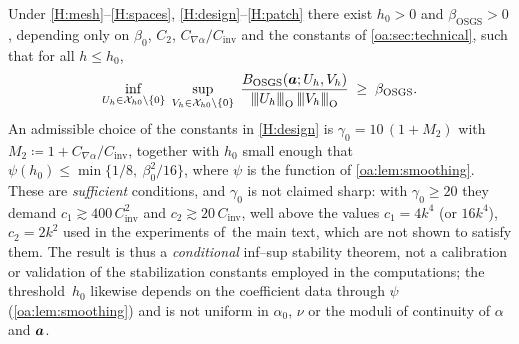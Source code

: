 \begin{theorem}
\label{oa:th:stability}
Under \cref{H:mesh}--\cref{H:spaces}, \cref{H:design}--\cref{H:patch} there exist $h_0 > 0$ and $\beta_{\mathrm{OSGS}} > 0$,
depending only on $\beta_0$, $C_2$, $C_{\nabla\alpha}/C_{\mathrm{inv}}$ and the constants of
\cref{oa:sec:technical}, such that for all $h \le h_0$,
\begin{equation}
  \label{oa:eq:InfSup}
  \inf_{U_h \in \mathcal{X}_{h0}\setminus\{0\}}\;
  \sup_{V_h \in \mathcal{X}_{h0}\setminus\{0\}}\;
  \frac{B_{\mathrm{OSGS}}(\boldsymbol{a}; U_h, V_h)}{{\lvert\kern-0.25ex\lvert\kern-0.25ex\lvert U_h \rvert\kern-0.25ex\rvert\kern-0.25ex\rvert}_{\mathrm{O}}\,{\lvert\kern-0.25ex\lvert\kern-0.25ex\lvert V_h \rvert\kern-0.25ex\rvert\kern-0.25ex\rvert}_{\mathrm{O}}}
  \;\ge\; \beta_{\mathrm{OSGS}} .
\end{equation}
An admissible choice of the constants in \cref{H:design} is
$\gamma_0 = 10\,(1 + M_2)$ with $M_2 \coloneqq 1 + C_{\nabla\alpha}/C_{\mathrm{inv}}$,
together with $h_0$ small enough that
$\psi(h_0) \le \min\{1/8,\ \beta_0^2/16\}$, where $\psi$ is the function of
\cref{oa:lem:smoothing}. These are \emph{sufficient} conditions, and $\gamma_0$ is not claimed
sharp: with $\gamma_0 \ge 20$ they demand $c_1 \gtrsim 400\,C_{\mathrm{inv}}^2$ and
$c_2 \gtrsim 20\,C_{\mathrm{inv}}$, well above the values $c_1 = 4k^4$ (or $16k^4$),
$c_2 = 2k^2$ used in the experiments of~the main text, which are not shown to satisfy
them. The result is thus a \emph{conditional} inf--sup stability theorem, not a calibration
or validation of the stabilization constants employed in the computations; the
threshold~$h_0$ likewise depends on the coefficient data through $\psi$
(\cref{oa:lem:smoothing}) and is not uniform in $\alpha_0$, $\nu$ or the moduli of continuity
of $\alpha$ and $\boldsymbol{a}$.
\end{theorem}

